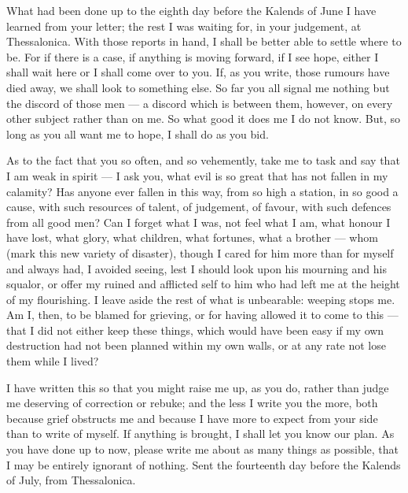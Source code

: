 

 What had been done up to the eighth day before the Kalends of June I have learned from your letter; the rest I was waiting for, in your judgement, at Thessalonica. With those reports in hand, I shall be better able to settle where to be. For if there is a case, if anything is moving forward, if I see hope, either I shall wait here or I shall come over to you. If, as you write, those rumours have died away, we shall look to something else. So far you all signal me nothing but the discord of those men --- a discord which is between them, however, on every other subject rather than on me. So what good it does me I do not know. But, so long as you all want me to hope, I shall do as you bid.

 As to the fact that you so often, and so vehemently, take me to task and say that I am weak in spirit --- I ask you, what evil is so great that has not fallen in my calamity? Has anyone ever fallen in this way, from so high a station, in so good a cause, with such resources of talent, of judgement, of favour, with such defences from all good men? Can I forget what I was, not feel what I am, what honour I have lost, what glory, what children, what fortunes, what a brother --- whom (mark this new variety of disaster), though I cared for him more than for myself and always had, I avoided seeing, lest I should look upon his mourning and his squalor, or offer my ruined and afflicted self to him who had left me at the height of my flourishing. I leave aside the rest of what is unbearable: weeping stops me. Am I, then, to be blamed for grieving, or for having allowed it to come to this --- that I did not either keep these things, which would have been easy if my own destruction had not been planned within my own walls, or at any rate not lose them while I lived?

 I have written this so that you might raise me up, as you do, rather than judge me deserving of correction or rebuke; and the less I write you the more, both because grief obstructs me and because I have more to expect from your side than to write of myself. If anything is brought, I shall let you know our plan. As you have done up to now, please write me about as many things as possible, that I may be entirely ignorant of nothing. Sent the fourteenth day before the Kalends of July, from Thessalonica.
